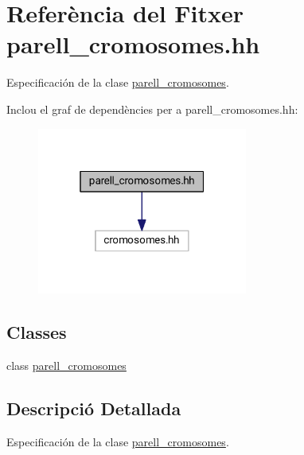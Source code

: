 \hypertarget{parell__cromosomes_8hh}{}\section{Referència del Fitxer parell\+\_\+cromosomes.\+hh}
\label{parell__cromosomes_8hh}


Especificación de la clase \hyperlink{classparell__cromosomes}{parell\+\_\+cromosomes}.  


Inclou el graf de dependències per a parell\+\_\+cromosomes.\+hh\+:
\nopagebreak
\begin{figure}[H]
\begin{center}
\leavevmode
\includegraphics[width=196pt]{parell__cromosomes_8hh__incl}
\end{center}
\end{figure}
\subsection*{Classes}
\begin{DoxyCompactItemize}
\item 
class \hyperlink{classparell__cromosomes}{parell\+\_\+cromosomes}
\end{DoxyCompactItemize}


\subsection{Descripció Detallada}
Especificación de la clase \hyperlink{classparell__cromosomes}{parell\+\_\+cromosomes}. 

